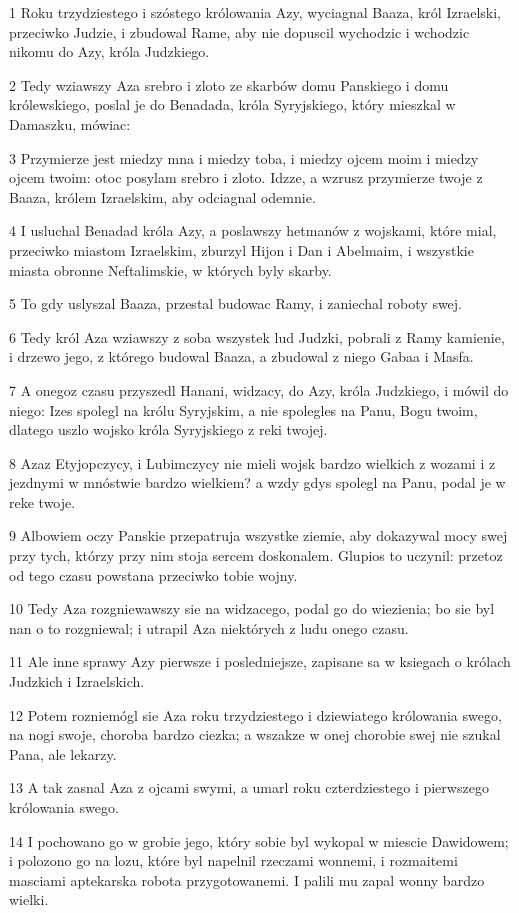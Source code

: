 \par 1 Roku trzydziestego i szóstego królowania Azy, wyciagnal Baaza, król Izraelski, przeciwko Judzie, i zbudowal Rame, aby nie dopuscil wychodzic i wchodzic nikomu do Azy, króla Judzkiego.
\par 2 Tedy wziawszy Aza srebro i zloto ze skarbów domu Panskiego i domu królewskiego, poslal je do Benadada, króla Syryjskiego, który mieszkal w Damaszku, mówiac:
\par 3 Przymierze jest miedzy mna i miedzy toba, i miedzy ojcem moim i miedzy ojcem twoim: otoc posylam srebro i zloto. Idzze, a wzrusz przymierze twoje z Baaza, królem Izraelskim, aby odciagnal odemnie.
\par 4 I usluchal Benadad króla Azy, a poslawszy hetmanów z wojskami, które mial, przeciwko miastom Izraelskim, zburzyl Hijon i Dan i Abelmaim, i wszystkie miasta obronne Neftalimskie, w których byly skarby.
\par 5 To gdy uslyszal Baaza, przestal budowac Ramy, i zaniechal roboty swej.
\par 6 Tedy król Aza wziawszy z soba wszystek lud Judzki, pobrali z Ramy kamienie, i drzewo jego, z którego budowal Baaza, a zbudowal z niego Gabaa i Masfa.
\par 7 A onegoz czasu przyszedl Hanani, widzacy, do Azy, króla Judzkiego, i mówil do niego: Izes spolegl na królu Syryjskim, a nie spolegles na Panu, Bogu twoim, dlatego uszlo wojsko króla Syryjskiego z reki twojej.
\par 8 Azaz Etyjopczycy, i Lubimczycy nie mieli wojsk bardzo wielkich z wozami i z jezdnymi w mnóstwie bardzo wielkiem? a wzdy gdys spolegl na Panu, podal je w reke twoje.
\par 9 Albowiem oczy Panskie przepatruja wszystke ziemie, aby dokazywal mocy swej przy tych, którzy przy nim stoja sercem doskonalem. Glupios to uczynil: przetoz od tego czasu powstana przeciwko tobie wojny.
\par 10 Tedy Aza rozgniewawszy sie na widzacego, podal go do wiezienia; bo sie byl nan o to rozgniewal; i utrapil Aza niektórych z ludu onego czasu.
\par 11 Ale inne sprawy Azy pierwsze i posledniejsze, zapisane sa w ksiegach o królach Judzkich i Izraelskich.
\par 12 Potem rozniemógl sie Aza roku trzydziestego i dziewiatego królowania swego, na nogi swoje, choroba bardzo ciezka; a wszakze w onej chorobie swej nie szukal Pana, ale lekarzy.
\par 13 A tak zasnal Aza z ojcami swymi, a umarl roku czterdziestego i pierwszego królowania swego.
\par 14 I pochowano go w grobie jego, który sobie byl wykopal w miescie Dawidowem; i polozono go na lozu, które byl napelnil rzeczami wonnemi, i rozmaitemi masciami aptekarska robota przygotowanemi. I palili mu zapal wonny bardzo wielki.


